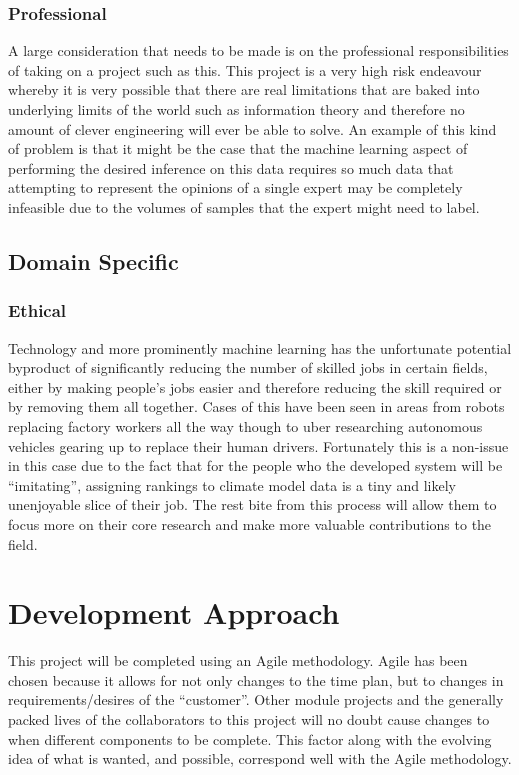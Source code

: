 \documentclass{ecmm427_assignment}
\begin{document}
\subsubsection{Professional}

A large consideration that needs to be made is on the professional
responsibilities of taking on a project such as this. This project
is a very high risk endeavour whereby it is very possible that there
are real limitations that are baked into underlying limits of the world
such as information theory and therefore no amount of clever engineering
will ever be able to solve. An example of this kind of problem is
that it might be the case that the machine learning aspect of performing
the desired inference on this data requires so much data that attempting
to represent the opinions of a single expert may be completely infeasible
due to the volumes of samples that the expert might need to label. 

\subsection{Domain Specific}

\subsubsection{Ethical}

Technology and more prominently machine learning has the unfortunate
potential byproduct of significantly reducing the number of skilled
jobs in certain fields, either by making people's jobs easier and
therefore reducing the skill required or by removing them all together.
Cases of this have been seen in areas from robots replacing factory
workers all the way though to uber researching autonomous vehicles
gearing up to replace their human drivers. Fortunately this is a non-issue
in this case due to the fact that for the people who the developed
system will be ``imitating'', assigning rankings to climate model
data is a tiny and likely unenjoyable slice of their job. The rest bite
from this process will allow them to focus more on their core research
and make more valuable contributions to the field. 



\section{Development Approach}
\quad This project will be completed using an Agile methodology. Agile has been chosen because it allows for not only changes to the time plan, but to changes in requirements/desires of the “customer”. Other module projects and the generally packed lives of the collaborators to this project will no doubt cause changes to when different components to be complete. This factor along with the evolving idea of what is wanted, and possible, correspond well with the Agile methodology.\par
\end{document}
